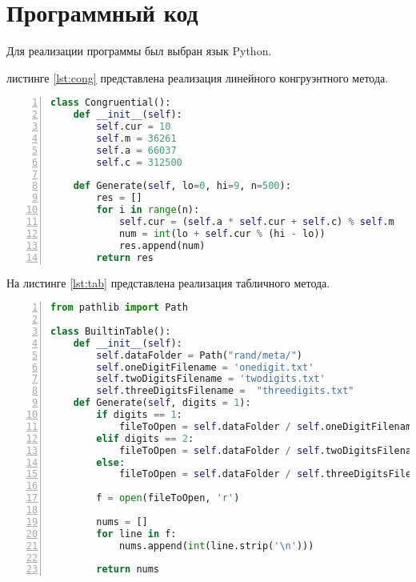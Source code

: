 \chapter{Программный код}

Для реализации программы был выбран язык Python. %


 листинге \ref{lst:cong} представлена реализация линейного конгруэнтного метода.
\begin{lstlisting}[language=Python,
    frame= tb,
    numbers=left,
    numberstyle=\footnotesize,
    caption={Релаизация линейного конгруэнтного метода},
    label={lst:cong}]
class Congruential():
    def __init__(self):
        self.cur = 10
        self.m = 36261
        self.a = 66037
        self.c = 312500

    def Generate(self, lo=0, hi=9, n=500):
        res = []
        for i in range(n):
            self.cur = (self.a * self.cur + self.c) % self.m
            num = int(lo + self.cur % (hi - lo))
            res.append(num)
        return res
\end{lstlisting}
На листинге \ref{lst:tab} представлена реализация табличного метода. 
\begin{lstlisting}[language=Python,
    frame= tb,
    numbers=left,
    numberstyle=\footnotesize,
    caption={Релаизация табличного метода},
    label={lst:tab}]
from pathlib import Path

class BuiltinTable():
    def __init__(self):
        self.dataFolder = Path("rand/meta/")
        self.oneDigitFilename = 'onedigit.txt'
        self.twoDigitsFilename = 'twodigits.txt'
        self.threeDigitsFilename =  "threedigits.txt"
    def Generate(self, digits = 1):
        if digits == 1:
            fileToOpen = self.dataFolder / self.oneDigitFilename
        elif digits == 2:
            fileToOpen = self.dataFolder / self.twoDigitsFilename
        else:
            fileToOpen = self.dataFolder / self.threeDigitsFilename
        
        f = open(fileToOpen, 'r')

        nums = []
        for line in f:
            nums.append(int(line.strip('\n')))
            
        return nums
\end{lstlisting}

